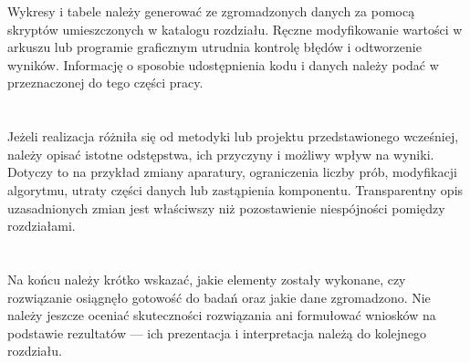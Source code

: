 Wykresy i tabele należy generować ze zgromadzonych danych za pomocą skryptów umieszczonych w katalogu rozdziału. Ręczne modyfikowanie wartości w arkuszu lub programie graficznym utrudnia kontrolę błędów i odtworzenie wyników. Informację o sposobie udostępnienia kodu i danych należy podać w przeznaczonej do tego części pracy.

\section{}

Jeżeli realizacja różniła się od metodyki lub projektu przedstawionego wcześniej, należy opisać istotne odstępstwa, ich przyczyny i możliwy wpływ na wyniki. Dotyczy to na przykład zmiany aparatury, ograniczenia liczby prób, modyfikacji algorytmu, utraty części danych lub zastąpienia komponentu. Transparentny opis uzasadnionych zmian jest właściwszy niż pozostawienie niespójności pomiędzy rozdziałami.

\section{}

Na końcu należy krótko wskazać, jakie elementy zostały wykonane, czy rozwiązanie osiągnęło gotowość do badań oraz jakie dane zgromadzono. Nie należy jeszcze oceniać skuteczności rozwiązania ani formułować wniosków na podstawie rezultatów — ich prezentacja i interpretacja należą do kolejnego rozdziału.
